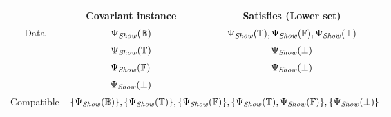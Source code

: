 \begin{landscape}

  \begin{figure}[ht]
    \begin{center}
      \begin{tabular}{| c | c c |}
        \hline
                   & Covariant instance                                                                                                                                                                             & Satisfies (Lower set)                                                                                                                   \\
        \hline
        Data       & $\Psi_\mathit{Show}(\mathbb{B})$                                                                                                                                                                             & $\Psi_\mathit{Show}(\mathbb{T}), \Psi_\mathit{Show}(\mathbb{F}), \Psi_\mathit{Show}(\bot)$                                                                         \\
                   & $\Psi_\mathit{Show}(\mathbb{T})$                                                                                                                                                                        & $\Psi_\mathit{Show}(\bot)$                                                                                                                       \\
                   & $\Psi_\mathit{Show}(\mathbb{F})$                                                                                                                                                                        & $\Psi_\mathit{Show}(\bot)$                                                                                                                       \\
                   & $\Psi_\mathit{Show}(\bot)$                                                                                                                                                                              &                                                                                                                                         \\
        \hline
        Compatible & \multicolumn{2}{c|}{$\{\Psi_\mathit{Show}(\mathbb{B})\}, \{ \Psi_\mathit{Show}(\mathbb{T}) \}, \{ \Psi_\mathit{Show}(\mathbb{F}) \}, \{ \Psi_\mathit{Show}(\mathbb{T}), \Psi_\mathit{Show}(\mathbb{F}) \}, \{\Psi_\mathit{Show}(\bot)\} $}                                                                                                                                                          \\

\end{tabular}
\end{center}
\end{figure}
\end{landscape}
